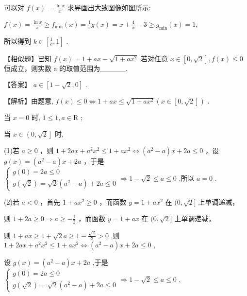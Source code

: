\documentclass[10pt]{article}
\begin{document}
可以对 \(f\left( x\right)  = \frac{\ln x}{x}\) 求导画出大致图像如图所示:

\(f\left( x\right)  = \frac{\ln x}{x} \geq  {f}_{\min }\left( x\right)  = \frac{1}{e}g\left( x\right)  = x + \frac{4}{x} - 3 \geq  {g}_{\min }\left( x\right)  = 1,\)

所以得到 \(k \in  \left\lbrack  {\frac{1}{e},1}\right\rbrack\) .

【相似题】已知 \(f\left( x\right)  = 1 + {ax} - \sqrt{1 + a{x}^{2}}\) 若对任意 \(x \in  \left\lbrack  {0,\sqrt{2}}\right\rbrack  ,f\left( x\right)  \leq  0\) 恒成立，则实数 \(\mathrm{a}\) 的取值范围为\_\_\_\_\_.

【答案】 \(a \in  \left\lbrack  {1 - \sqrt{2},0}\right\rbrack\) .

【解析】由题意, \(f\left( x\right)  \leq  0 \Leftrightarrow  1 + {ax} \leq  \sqrt{1 + a{x}^{2}}\left( {x \in  \left\lbrack  {0,\sqrt{2}}\right\rbrack  }\right)\) .

当 \(x = 0\) 时, \(1 \leq  1,a \in  \mathrm{R}\) ;

当 \(x \in  \left( {0,\sqrt{2}}\right\rbrack\) 时,

(1)若 \(a \geq  0\) ，则 \(1 + {2ax} + {a}^{2}{x}^{2} \leq  1 + a{x}^{2} \Leftrightarrow  \left( {{a}^{2} - a}\right) x + {2a} \leq  0\) ，设 \(g\left( x\right)  = \left( {{a}^{2} - a}\right) x + {2a}\) ，于是 \(\left\{  {\begin{matrix} g\left( 0\right)  = {2a} \leq  0 \\  g\left( \sqrt{2}\right)  = \sqrt{2}\left( {{a}^{2} - a}\right)  + {2a} \leq  0 \end{matrix} \Rightarrow  1 - \sqrt{2} \leq  a \leq  0}\right.\) ,所以 \(a = 0\) .

(2)若 \(a < 0\) ，首先 \(1 + a{x}^{2} \geq  0\) ，而函数 \(y = 1 + a{x}^{2}\) 在 \((0,\sqrt{2}\rbrack\) 上单调递减，

则 \(1 + {2a} \geq  0 \Rightarrow  a \geq   - \frac{1}{2}\) ，而函数 \(y = 1 + {ax}\) 在 \((0,\sqrt{2}\rbrack\) 上单调递减，

则 \(1 + {ax} \geq  1 + \sqrt{2}a \geq  1 - \frac{\sqrt{2}}{2} > 0\) ,则 \(1 + {2ax} + {a}^{2}{x}^{2} \leq  1 + a{x}^{2} \Leftrightarrow  \left( {{a}^{2} - a}\right) x + {2a} \leq  0\) ,

设 \(g\left( x\right)  = \left( {{a}^{2} - a}\right) x + {2a}\) ,于是 \(\left\{  \begin{matrix} g\left( 0\right)  = {2a} \leq  0 \\  g\left( \sqrt{2}\right)  = \sqrt{2}\left( {{a}^{2} - a}\right)  + {2a} \leq  0 \end{matrix}\right.  \Rightarrow  1 - \sqrt{2} \leq  a \leq  0\) ,
\end{document}
